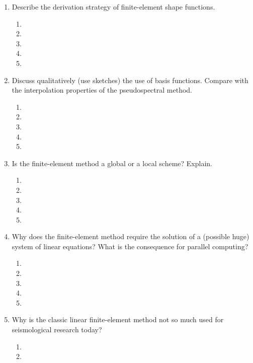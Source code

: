 \begin{enumerate}
\begin{enumerate}
\item[]
\item[] 
\item[]
\item[] 
\end{enumerate}
\item Describe the derivation strategy  of finite-element shape functions.
\begin{enumerate}
\item[]
\item[]
\item[] 
\item[]
\item[] 
\end{enumerate}
\item Discuss qualitatively (use sketches) the use of basis functions. Compare with the interpolation properties of the pseudospectral method. 
\begin{enumerate}
\item[]
\item[]
\item[] 
\item[]
\item[] 
\end{enumerate}
\item Is the finite-element method a global or a local scheme? Explain.
\begin{enumerate}
\item[]
\item[]
\item[] 
\item[]
\item[] 
\end{enumerate}
\item Why does the finite-element method require the solution of a (possible huge) system of linear equations? What is the consequence for parallel computing?
\begin{enumerate}
\item[]
\item[]
\item[] 
\item[]
\item[] 
\end{enumerate}
\item Why is the classic linear finite-element method not so much used for seismological research today?
\begin{enumerate}
\item[]
\item[]

\end{enumerate}
\end{enumerate}

